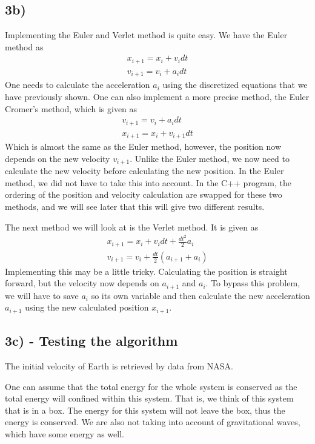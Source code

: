 \documentclass[12pt]{article}
\begin{document}
\subsection*{3b)}
Implementing the Euler and Verlet method is quite easy. We have the Euler method as
\begin{align*}
x_{i+1} = x_i + v_idt \\
v_{i+1} = v_i + a_idt
\end{align*}
One needs to calculate the acceleration $a_i$ using the discretized equations that we have previously shown. One can also implement a more precise method, the Euler Cromer's method, which is given as
\begin{align*}
v_{i+1} = v_i + a_idt \\
x_{i+1} = x_i + v_{i+1}dt
\end{align*}
Which is almost the same as the Euler method, however, the position now depends on the new velocity $v_{i+1}$. Unlike the Euler method, we now need to calculate the new velocity before calculating the new position. In the Euler method, we did not have to take this into account. In the C++ program, the ordering of the position and velocity calculation are swapped for these two methods, and we will see later that this will give two different results.

The next method we will look at is the Verlet method. It is given as
\begin{align*}
x_{i+1} = x_i + v_idt + \frac{dt^2}{2}a_i\\
v_{i+1} = v_i + \frac{dt}{2}\left(a_{i+1} + a_i \right)
\end{align*}
Implementing this may be a little tricky. Calculating the position is straight forward, but the velocity now depends on $a_{i+1}$ and $a_i$. To bypass this problem, we will have to save $a_i$ so its own variable and then calculate the new acceleration $a_{i+1}$ using the new calculated position $x_{i+1}$. 

\subsection*{3c) - Testing the algorithm}
The initial velocity of Earth is retrieved by data from NASA.

One can assume that the total energy for the whole system is conserved as the total energy will confined within this system. That is, we think of this system that is in a box. The energy for this system will not leave the box, thus the energy is conserved. We are also not taking into account of gravitational waves, which have some energy as well.
\end{document}
